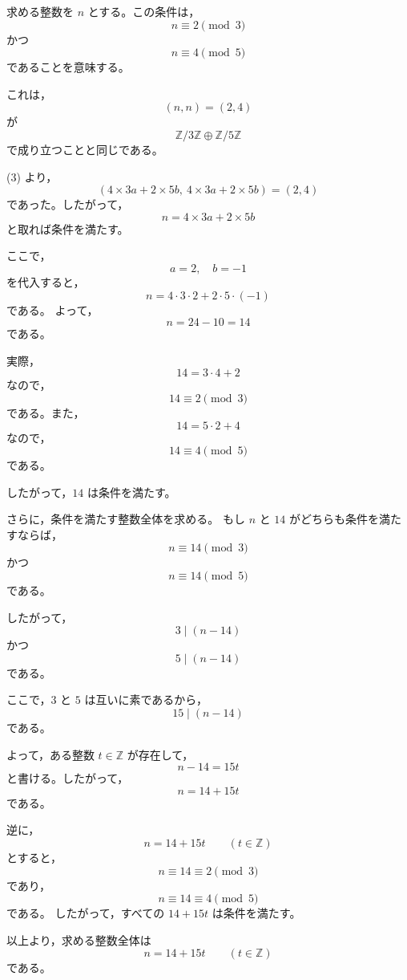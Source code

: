 \begin{solution}
\begin{enumerate}
		求める整数を \(n\) とする。この条件は，
		\[
		n\equiv 2\pmod{3}
		\]
		かつ
		\[
		n\equiv 4\pmod{5}
		\]
		であることを意味する。
		
		これは，
		\[
		(n,n)=(2,4)
		\]
		が
		\[
		\mathbb{Z}/3\mathbb{Z}
		\oplus
		\mathbb{Z}/5\mathbb{Z}
		\]
		で成り立つことと同じである。
		
		(3) より，
		\[
		(4\times 3a+2\times 5b,\ 4\times 3a+2\times 5b)
		=
		(2,4)
		\]
		であった。したがって，
		\[
		n=4\times 3a+2\times 5b
		\]
		と取れば条件を満たす。
		
		ここで，
		\[
		a=2,\quad b=-1
		\]
		を代入すると，
		\[
		n
		=
		4\cdot 3\cdot 2
		+
		2\cdot 5\cdot(-1)
		\]
		である。
		よって，
		\[
		n=24-10=14
		\]
		である。
		
		実際，
		\[
		14=3\cdot 4+2
		\]
		なので，
		\[
		14\equiv 2\pmod{3}
		\]
		である。また，
		\[
		14=5\cdot 2+4
		\]
		なので，
		\[
		14\equiv 4\pmod{5}
		\]
		である。
		
		したがって，\(14\) は条件を満たす。
		
		さらに，条件を満たす整数全体を求める。
		もし \(n\) と \(14\) がどちらも条件を満たすならば，
		\[
		n\equiv 14\pmod{3}
		\]
		かつ
		\[
		n\equiv 14\pmod{5}
		\]
		である。
		
		したがって，
		\[
		3\mid(n-14)
		\]
		かつ
		\[
		5\mid(n-14)
		\]
		である。
		
		ここで，\(3\) と \(5\) は互いに素であるから，
		\[
		15\mid(n-14)
		\]
		である。
		
		よって，ある整数 \(t\in\mathbb{Z}\) が存在して，
		\[
		n-14=15t
		\]
		と書ける。したがって，
		\[
		n=14+15t
		\]
		である。
		
		逆に，
		\[
		n=14+15t
		\qquad
		(t\in\mathbb{Z})
		\]
		とすると，
		\[
		n\equiv 14\equiv 2\pmod{3}
		\]
		であり，
		\[
		n\equiv 14\equiv 4\pmod{5}
		\]
		である。
		したがって，すべての \(14+15t\) は条件を満たす。
		
		以上より，求める整数全体は
		\[
		\boxed{
			n=14+15t
			\qquad
			(t\in\mathbb{Z})
		}
		\]
		である。
	\end{enumerate}
\end{solution}